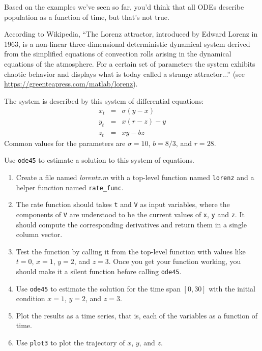\begin{ex}


Based on the examples we've seen so far, you'd think that all ODEs describe population as
a function of time, but that's not true.

According to Wikipedia, ``The Lorenz attractor, introduced by Edward Lorenz in 1963, is a
non-linear three-dimensional deterministic dynamical system derived
from the simplified equations of convection rolls arising in the
dynamical equations of the atmosphere. For a certain set of parameters
the system exhibits chaotic behavior and displays what is today called
a strange attractor...'' (see \url{https://greenteapress.com/matlab/lorenz}).

The system is described by this system of differential equations:
%
\begin{eqnarray}
x_t &=& \sigma (y - x)  \\
y_t &=& x (r - z) - y   \\
z_t &=& xy - b z
\end{eqnarray}
%
Common values for the parameters are $\sigma = 10$, $b = 8/3$, and $r=28$.

Use {\tt ode45} to estimate a solution to this system of equations.


\begin{enumerate}

\item Create a file named {\em lorentz.m} with a top-level function named {\tt lorenz} and a helper function named \verb"rate_func".

\item  The rate function should
takes {\tt t} and {\tt V} as input variables, where the components
of {\tt V} are understood to be the current values of {\tt x},
{\tt y} and {\tt z}.  It should compute the corresponding derivatives
and return them in a single column vector.

\item Test the function by calling it from the top-level function with values like $t=0$, $x=1$, $y=2$, and $z=3$.  
Once you get your function working, you should make it a silent function before calling {\tt ode45}.

\item Use {\tt ode45} to estimate the solution for the time span $[0, 30]$
with the initial condition $x=1$, $y=2$, and $z=3$.

\item Plot the results as a time series, that is, each of the variables as a function of time.

\item Use {\tt plot3} to plot the trajectory of $x$, $y$, and $z$.

\end{enumerate}

\end{ex}

